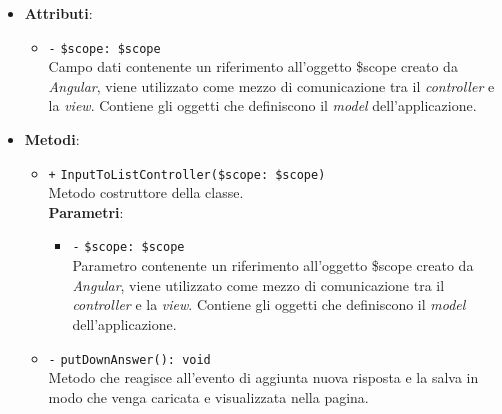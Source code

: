 \begin{itemize}
\begin{itemize}
	\end{itemize}
	\item \textbf{Attributi}:
	\begin{itemize}
		\item \texttt{-} \texttt{\$scope: \$scope} \\
		Campo dati contenente un riferimento all’oggetto \$scope creato da \textit{Angular}, viene utilizzato come mezzo di comunicazione tra il \textit{controller} e la \textit{view}. Contiene gli oggetti che definiscono il \textit{model} dell’applicazione.
	\end{itemize}
	\item \textbf{Metodi}:
	\begin{itemize}
		\item \texttt{+} \texttt{InputToListController(\$scope: \$scope)} \\Metodo costruttore della classe. \\
		\textbf{Parametri}:
		\begin{itemize}
			\item \texttt{-} \texttt{\$scope: \$scope} \\
			Parametro contenente un riferimento all’oggetto \$scope creato da \textit{Angular}, viene utilizzato come mezzo di comunicazione tra il \textit{controller} e la \textit{view}. Contiene gli oggetti che definiscono il \textit{model} dell'applicazione. 
		\end{itemize}
		\item \texttt{-} \texttt{putDownAnswer(): void} \\Metodo che reagisce all'evento di aggiunta nuova risposta e la salva in modo che venga caricata e visualizzata nella pagina.
	\end{itemize}
\end{itemize}

